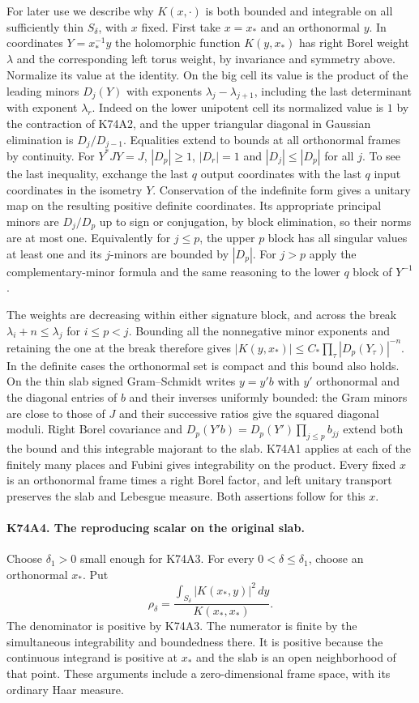 For later use we describe why $K(x,\cdot)$ is both bounded and
integrable on all sufficiently thin $S_\delta$, with $x$ fixed.
First take $x=x_*$ and an orthonormal $y$. In coordinates
$Y=x_*^{-1}y$ the holomorphic function $K(y,x_*)$ has right Borel
weight $\lambda$ and the corresponding left torus weight, by
invariance and symmetry above. Normalize its value at the identity.
On the big cell its value is the product of the leading minors
$D_j(Y)$ with exponents $\lambda_j-\lambda_{j+1}$, including the
last determinant with exponent $\lambda_r$. Indeed on the lower
unipotent cell its normalized value is $1$ by the contraction of
K74A2, and the upper triangular diagonal in Gaussian elimination
is $D_j/D_{j-1}$. Equalities extend to bounds at all orthonormal
frames by continuity. For $Y^*JY=J$, $|D_p|\ge1$,
$|D_r|=1$ and $|D_j|\le |D_p|$ for all $j$. To see the last
inequality, exchange the last $q$ output coordinates with the
last $q$ input coordinates in the isometry $Y$. Conservation of
the indefinite form gives a unitary map on the resulting positive
definite coordinates. Its appropriate principal minors are
$D_j/D_p$ up to sign or conjugation, by block elimination, so their
norms are at most one. Equivalently for $j\le p$, the upper $p$
block has all singular values at least one and its $j$-minors are
bounded by $|D_p|$. For $j>p$ apply the complementary-minor formula
and the same reasoning to the lower $q$ block of $Y^{-1}$.

The weights are decreasing within either signature block, and across
the break $\lambda_i+n\le\lambda_j$ for $i\le p<j$.
Bounding all the nonnegative minor exponents and retaining the
one at the break therefore gives $|K(y,x_*)|\le
C_*\prod_\tau |D_p(Y_\tau)|^{-n}$. In the definite cases the
orthonormal set is compact and this bound also holds. On the thin
slab signed Gram--Schmidt writes $y=y' b$ with $y'$ orthonormal
and the diagonal entries of $b$ and their inverses uniformly
bounded: the Gram minors are close to those of $J$ and their
successive ratios give the squared diagonal moduli. Right Borel
covariance and $D_p(Y'b)=D_p(Y')\prod_{j\le p} b_{jj}$ extend
both the bound and this integrable majorant to the slab. K74A1
applies at each of the finitely many places and Fubini gives
integrability on the product. Every fixed $x$ is an orthonormal
frame times a right Borel factor, and left unitary transport preserves
the slab and Lebesgue measure. Both assertions follow for this $x$.

\paragraph{K74A4. The reproducing scalar on the original slab.}
Choose $\delta_1>0$ small enough for K74A3. For every
$0<\delta\le\delta_1$, choose an orthonormal $x_*$. Put
\[
   \rho_\delta=
   \frac{\int_{S_\delta}|K(x_*,y)|^2\,dy}{K(x_*,x_*)}.
\]
The denominator is positive by K74A3. The numerator is finite by
the simultaneous integrability and boundedness there. It is
positive because the continuous integrand is positive at $x_*$
and the slab is an open neighborhood of that point. These arguments
include a zero-dimensional frame space, with its ordinary Haar
measure.

